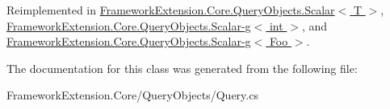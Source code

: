 Reimplemented in \hyperlink{class_framework_extension_1_1_core_1_1_query_objects_1_1_scalar-g_ad6de4637a09a695d7934b52f5008369b}{Framework\-Extension.\-Core.\-Query\-Objects.\-Scalar$<$ T $>$}, \hyperlink{class_framework_extension_1_1_core_1_1_query_objects_1_1_scalar-g_ad6de4637a09a695d7934b52f5008369b}{Framework\-Extension.\-Core.\-Query\-Objects.\-Scalar-\/g$<$ int $>$}, and \hyperlink{class_framework_extension_1_1_core_1_1_query_objects_1_1_scalar-g_ad6de4637a09a695d7934b52f5008369b}{Framework\-Extension.\-Core.\-Query\-Objects.\-Scalar-\/g$<$ Foo $>$}.



The documentation for this class was generated from the following file\-:\begin{DoxyCompactItemize}
\item 
Framework\-Extension.\-Core/\-Query\-Objects/Query.\-cs\end{DoxyCompactItemize}
